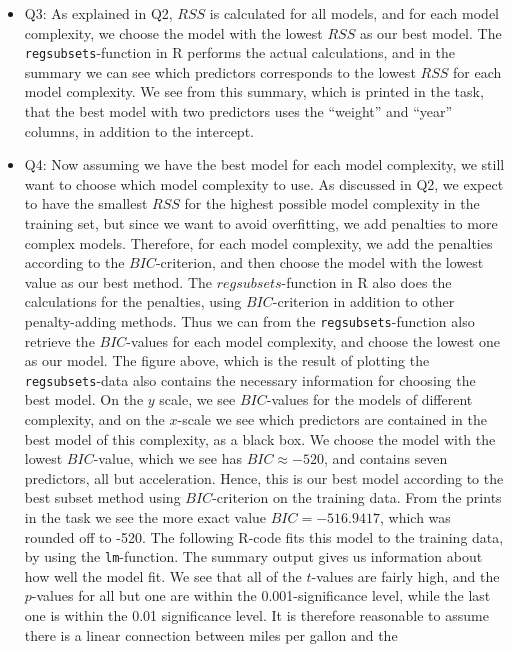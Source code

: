 \documentclass[]{article}
\begin{document}
\begin{itemize}
\item
  Q3: As explained in Q2, \(RSS\) is calculated for all models, and for
  each model complexity, we choose the model with the lowest \(RSS\) as
  our best model. The \texttt{regsubsets}-function in R performs the
  actual calculations, and in the summary we can see which predictors
  corresponds to the lowest \(RSS\) for each model complexity. We see
  from this summary, which is printed in the task, that the best model
  with two predictors uses the ``weight'' and ``year'' columns, in
  addition to the intercept.
\item
  Q4: Now assuming we have the best model for each model complexity, we
  still want to choose which model complexity to use. As discussed in
  Q2, we expect to have the smallest \(RSS\) for the highest possible
  model complexity in the training set, but since we want to avoid
  overfitting, we add penalties to more complex models. Therefore, for
  each model complexity, we add the penalties according to the
  \(BIC\)-criterion, and then choose the model with the lowest value as
  our best method. The \(regsubsets\)-function in R also does the
  calculations for the penalties, using \(BIC\)-criterion in addition to
  other penalty-adding methods. Thus we can from the
  \texttt{regsubsets}-function also retrieve the \(BIC\)-values for each
  model complexity, and choose the lowest one as our model. The figure
  above, which is the result of plotting the \texttt{regsubsets}-data
  also contains the necessary information for choosing the best model.
  On the \(y\) scale, we see \(BIC\)-values for the models of different
  complexity, and on the \(x\)-scale we see which predictors are
  contained in the best model of this complexity, as a black box. We
  choose the model with the lowest \(BIC\)-value, which we see has
  \(BIC\approx -520\), and contains seven predictors, all but
  acceleration. Hence, this is our best model according to the best
  subset method using \(BIC\)-criterion on the training data. From the
  prints in the task we see the more exact value \(BIC=-516.9417\),
  which was rounded off to -520. The following R-code fits this model to
  the training data, by using the \texttt{lm}-function. The summary
  output gives us information about how well the model fit. We see that
  all of the \(t\)-values are fairly high, and the \(p\)-values for all
  but one are within the 0.001-significance level, while the last one is
  within the 0.01 significance level. It is therefore reasonable to
  assume there is a linear connection between miles per gallon and the

\end{itemize}
\end{document}
